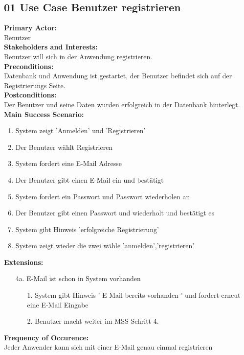 \documentclass[12pt,a4paper,onecolumn]{article}
\begin{document}
\subsection{01 Use Case Benutzer registrieren}
\textbf{Primary Actor:}\\ Benutzer\\
\textbf{Stakeholders and Interests:}\\Benutzer will sich in der Anwendung registrieren.\\
\textbf{Preconditions:} \\Datenbank und Anwendung ist gestartet, der Benutzer befindet sich auf der Registrierungs Seite.\\
\textbf{Postconditions:}\\ Der Benutzer und seine Daten wurden erfolgreich in der Datenbank hinterlegt. \\
\textbf{Main Success Scenario:}
\begin{enumerate}
    \item System zeigt 'Anmelden' und 'Registrieren'
    \item Der Benutzer wählt Registrieren
    \item System fordert eine E-Mail Adresse
    \item Der Benutzer gibt einen E-Mail ein und bestätigt
    \item System fordert ein Passwort und Passwort wiederholen an
    \item Der Benutzer gibt einen Passwort und wiederholt und bestätigt es
    \item System gibt Hinweis 'erfolgreiche Registrierung'
    \item System zeigt wieder die zwei wähle 'anmelden','registrieren'
\end{enumerate}
\textbf{Extensions:}
\begin{enumerate}
    \item [4a.]  E-Mail ist schon in System vorhanden
    \begin{enumerate}
        \item[1.]System gibt Hinweis ' E-Mail bereits vorhanden ' und fordert erneut eine E-Mail Eingabe
        \item[2.]Benutzer macht weiter im MSS Schritt 4.
    \end{enumerate}
\end{enumerate}
\textbf{Frequency of Occurence:} \\Jeder Anwender kann sich mit einer E-Mail genau einmal registrieren\\
\end{document}
